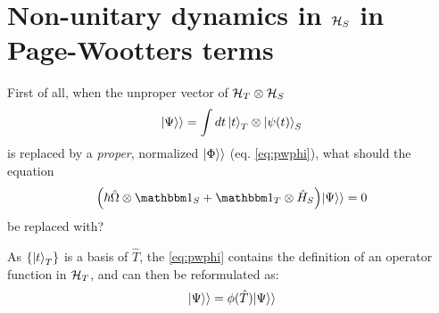 \section{Non-unitary dynamics in $\mathcal{H}_S$ in Page-Wootters terms}

First of all,
when the unproper vector of $\mathcal{H}_T \otimes \mathcal{H}_S$
\begin{equation}
  |\Psi\rangle\rangle = \int dt \ket{t}_{T} \otimes \ket{\psi(t)}_{S}
\end{equation}
is replaced by a \emph{proper}, normalized $|\Phi\rangle\rangle$ (eq. \ref{eq:pwphi}),
what should the equation
\begin{equation}
  \qty(\hbar\hat{\Omega} \ox \idop_S + \idop_T \ox \hat{H}_S)\dket{\Psi} = 0
\end{equation}
be replaced with?

As $\left\{\ket{t}_T\right\}$ is a basis of $\hat{T}$, the \eqref{eq:pwphi}
contains the definition of an operator function in $\mathcal{H}_T$,
and can then be reformulated as:
\begin{equation}
  |\Psi\rangle\rangle = \phi(\hat{T})|\Psi\rangle\rangle
\end{equation}